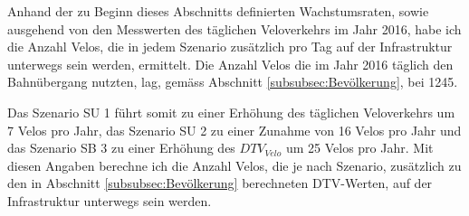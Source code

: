 Anhand der zu Beginn dieses Abschnitts definierten Wachstumsraten, sowie ausgehend von den Messwerten des täglichen Veloverkehrs im Jahr 2016, habe ich die Anzahl Velos, die in jedem Szenario zusätzlich pro Tag auf der Infrastruktur unterwegs sein werden, ermittelt. 
Die Anzahl Velos die im Jahr 2016 täglich den Bahnübergang nutzten, lag, gemäss Abschnitt \ref{subsubsec:Bevölkerung}, bei 1245.

Das Szenario SU 1 führt somit zu einer Erhöhung des täglichen Veloverkehrs um 7 Velos pro Jahr, das Szenario SU 2 zu einer Zunahme von 16 Velos pro Jahr und das Szenario SB 3 zu einer Erhöhung des $DTV_{Velo}$ um 25 Velos pro Jahr. 
Mit diesen Angaben berechne ich die Anzahl Velos, die je nach Szenario, zusätzlich zu den in Abschnitt \ref{subsubsec:Bevölkerung} berechneten DTV-Werten, auf der Infrastruktur unterwegs sein werden.

\pagebreak

%

